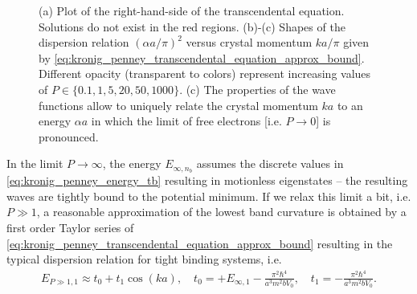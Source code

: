 \begin{figure}
    \caption{
    (a) Plot of the right-hand-side of the transcendental equation. Solutions do not exist in the red regions.
    (b)-(c) Shapes of the dispersion relation $(\alpha a/\pi)^2$ versus crystal momentum $ka/\pi$ given by \cref{eq:kronig_penney_transcendental_equation_approx_bound}.
    Different opacity (transparent to colors) represent increasing values of $P\in\{0.1,1,5,20,50,1000\}$.
    (c) The properties of the wave functions allow to uniquely relate the crystal momentum $ka$ to an energy $\alpha a$ in which the limit of free electrons [i.e. $P\rightarrow0$] is pronounced.}
    \label{fig:kronig_penney_dispersion}
\end{figure}

In the limit $P\rightarrow\infty$, the energy $E_{\infty,n_b}$ assumes the discrete values in \cref{eq:kronig_penney_energy_tb} resulting in motionless eigenstates -- the resulting waves are tightly bound to the potential minimum.
If we relax this limit a bit, i.e. $P\gg 1$, a reasonable approximation of the lowest band curvature is obtained by a first order Taylor series of \cref{eq:kronig_penney_transcendental_equation_approx_bound} resulting in the typical dispersion relation for tight binding systems, i.e.
\begin{align}
    E_{P\gg1,1}\approx t_0 + t_1 \cos(k a),
    \quad
    t_0 = + E_{\infty,1} - \frac{\pi^2 \hbar^4}{a^3 m^2 b V_0},
    \quad
    t_1 = -\frac{\pi^2\hbar^4}{a^3 m^2 bV_0}.
    \label{eq:kronig_penney_tight_binding_dispersion}
\end{align}

